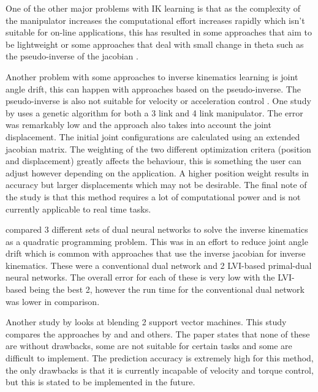 \documentclass[a4paper,11pt]{article}
\begin{document}
One of the other major problems with IK learning is that as the complexity of the manipulator increases the computational effort increases rapidly which isn't suitable for on-line applications, this has resulted in some approaches that aim to be lightweight or some approaches that deal with small change in theta such as the pseudo-inverse of the jacobian \citep{ikprob}.

Another problem with some approaches to inverse kinematics learning is joint angle drift, this can happen with approaches based on the pseudo-inverse. The pseudo-inverse is also not suitable for velocity or acceleration control \citep{2net}.
\newline
\newline
One study by \cite{genetic2} uses a genetic algorithm for both a 3 link and 4 link manipulator. The error was remarkably low and the approach also takes into account the joint displacement. The initial joint configurations are calculated using an extended jacobian matrix. The weighting of the two different optimization critera (position and displacement) greatly affects the behaviour, this is something the user can adjust however depending on the application. A higher position weight results in accuracy but larger displacements which may not be desirable. The final note of the study is that this method requires a lot of computational power and is not currently applicable to real time tasks.

\cite{2net} compared 3 different sets of dual neural networks to solve the inverse kinematics as a quadratic programming problem. This was in an effort to reduce joint angle drift which is common with approaches that use the inverse jacobian for inverse kinematics.
These were a conventional dual network and 2 LVI-based primal-dual neural networks. The overall error for each of these is very low with the LVI-based being the best 2, however the run time for the conventional dual network was lower in comparison.

Another study by \cite{2svm} looks at blending 2 support vector machines.
This study compares the approaches by \cite{genetic2} and \cite{2net} and others. The paper states that none of these are without drawbacks, some are not suitable for certain tasks and some are difficult to implement.
The prediction accuracy is extremely high for this method, the only drawbacks is that it is currently incapable of velocity and torque control, but this is stated to be implemented in the future.

\end{document}
